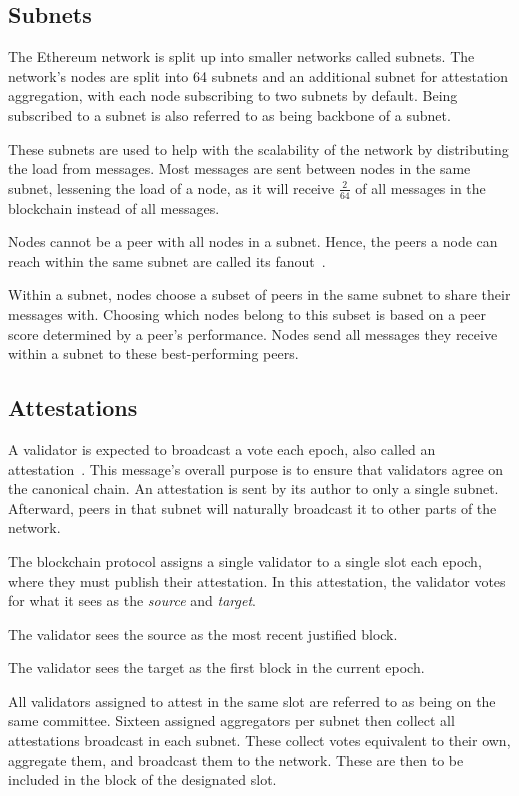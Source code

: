 \subsection{Subnets}\label{subsec:subnets}
The Ethereum network is split up into smaller networks called subnets.
The network's nodes are split into 64 subnets and an additional subnet for attestation aggregation, with each node subscribing to two subnets by default.
Being subscribed to a subnet is also referred to as being backbone of a subnet.

These subnets are used to help with the scalability of the network by distributing the load from messages.
Most messages are sent between nodes in the same subnet, lessening the load of a node, as it will receive $\frac{2}{64}$ of all messages in the blockchain instead of all messages.


Nodes cannot be a peer with all nodes in a subnet.
Hence, the peers a node can reach within the same subnet are called its fanout~\cite{heimbach2024deanonymizingethereumvalidatorsp2p}.

Within a subnet, nodes choose a subset of peers in the same subnet to share their messages with.
Choosing which nodes belong to this subset is based on a peer score determined by a peer's performance.
Nodes send all messages they receive within a subnet to these best-performing peers.

\subsection{Attestations}\label{subsec:attestations}
A validator is expected to broadcast a vote each epoch, also called an attestation~\cite{attestations}.
This message's overall purpose is to ensure that validators agree on the canonical chain.
An attestation is sent by its author to only a single subnet.
Afterward, peers in that subnet will naturally broadcast it to other parts of the network.

The blockchain protocol assigns a single validator to a single slot each epoch, where they must publish their attestation.
In this attestation, the validator votes for what it sees as the \textit{source} and \textit{target}.

The validator sees the source as the most recent justified block.

The validator sees the target as the first block in the current epoch.

All validators assigned to attest in the same slot are referred to as being on the same committee.
Sixteen assigned aggregators per subnet then collect all attestations broadcast in each subnet.
These collect votes equivalent to their own, aggregate them, and broadcast them to the network.
These are then to be included in the block of the designated slot.


